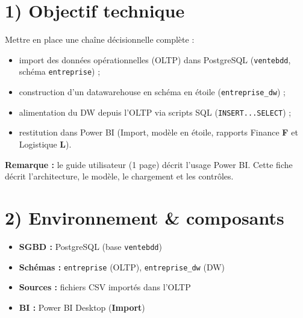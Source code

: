 \documentclass[a4paper,12pt]{article}
\begin{document}
\renewcommand{\contentsname}{Sommaire}
\tableofcontents
\newpage
{}
\setcounter{page}{1}


\section*{1) Objectif technique}
Mettre en place une chaîne décisionnelle complète :
\begin{itemize}
  \item import des données opérationnelles (OLTP) dans PostgreSQL (\texttt{ventebdd}, schéma \texttt{entreprise}) ;
  \item construction d’un datawarehouse en schéma en étoile (\texttt{entreprise\_dw}) ;
  \item alimentation du DW depuis l’OLTP via scripts SQL (\texttt{INSERT...SELECT}) ;
  \item restitution dans Power BI (Import, modèle en étoile, rapports Finance \textbf{F} et Logistique \textbf{L}).
\end{itemize}

\begin{tipbox}
\textbf{Remarque :} le guide utilisateur (1 page) décrit l’usage Power BI. Cette fiche décrit l’architecture, le modèle, le chargement et les contrôles.
\end{tipbox}

\section*{2) Environnement \& composants}
\begin{itemize}
  \item \textbf{SGBD :} PostgreSQL (base \texttt{ventebdd})
  \item \textbf{Schémas :} \texttt{entreprise} (OLTP), \texttt{entreprise\_dw} (DW)
  \item \textbf{Sources :} fichiers CSV importés dans l’OLTP
  \item \textbf{BI :} Power BI Desktop (\textbf{Import})
\end{itemize}
\end{document}

